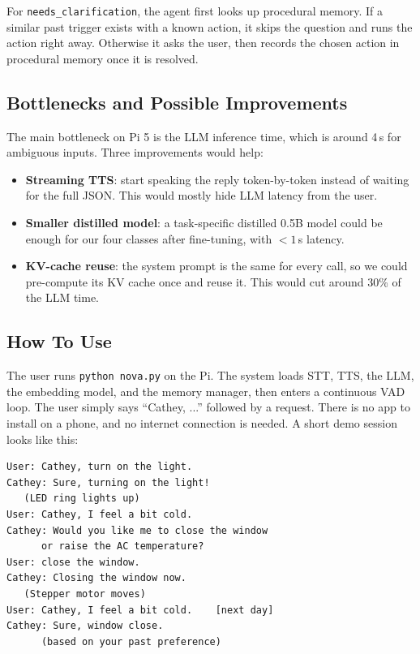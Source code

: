 \documentclass[conference]{IEEEtran}
\begin{document}
For \texttt{needs\_clarification}, the agent first looks up procedural memory. If a similar past trigger exists with a known action, it skips the question and runs the action right away. Otherwise it asks the user, then records the chosen action in procedural memory once it is resolved.

\subsection{Bottlenecks and Possible Improvements}

The main bottleneck on Pi 5 is the LLM inference time, which is around 4\,s for ambiguous inputs. Three improvements would help:
\begin{itemize}
    \item \textbf{Streaming TTS}: start speaking the reply token-by-token instead of waiting for the full JSON. This would mostly hide LLM latency from the user.
    \item \textbf{Smaller distilled model}: a task-specific distilled 0.5B model could be enough for our four classes after fine-tuning, with $<1$\,s latency.
    \item \textbf{KV-cache reuse}: the system prompt is the same for every call, so we could pre-compute its KV cache once and reuse it. This would cut around 30\% of the LLM time.
\end{itemize}

\subsection{How To Use}

The user runs \texttt{python nova.py} on the Pi. The system loads STT, TTS, the LLM, the embedding model, and the memory manager, then enters a continuous VAD loop. The user simply says ``Cathey, ...'' followed by a request. There is no app to install on a phone, and no internet connection is needed. A short demo session looks like this:
\begin{lstlisting}[basicstyle=\ttfamily\scriptsize]
User: Cathey, turn on the light.
Cathey: Sure, turning on the light!
   (LED ring lights up)
User: Cathey, I feel a bit cold.
Cathey: Would you like me to close the window
      or raise the AC temperature?
User: close the window.
Cathey: Closing the window now.
   (Stepper motor moves)
User: Cathey, I feel a bit cold.    [next day]
Cathey: Sure, window close.
      (based on your past preference)
\end{lstlisting}
\end{document}
